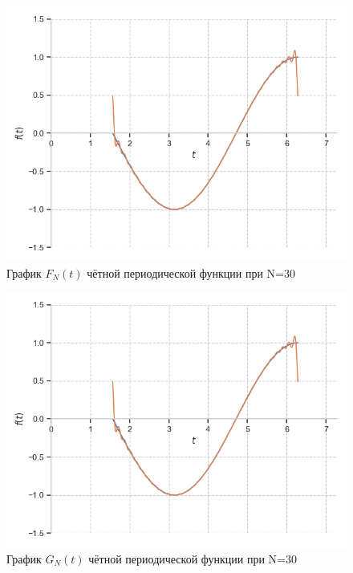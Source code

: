\documentclass[a4paper, 16pt]{article}
\begin{document}
\begin{figure}[!htb]
    \centering
    \includegraphics[scale=0.8]{fur_cos_n=30.png}
    \captionsetup{skip=0pt}
    \caption{График $F_N(t)$ чётной периодической функции при N=30}
    \label{Рис:17}
\end{figure}
\begin{figure}[!htb]
    \centering
    \includegraphics[scale=0.8]{cfur_cos_n=30.png}
    \captionsetup{skip=0pt}
    \caption{График $G_N(t)$ чётной периодической функции при N=30}
    \label{Рис:18}
\end{figure}
\newpage
\vspace*{10mm}
\end{document}
